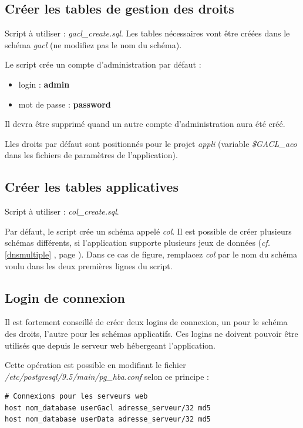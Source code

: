 \subsection{Créer les tables de gestion des droits}
Script à utiliser : \textit{gacl\_create.sql}. Les tables nécessaires vont être créées dans le schéma \textit{gacl} (ne modifiez pas le nom du schéma).

Le script crée un compte d'administration par défaut :
\begin{itemize}
\item login : \textbf{admin}
\item mot de passe : \textbf{password}
\end{itemize}

Il devra être supprimé quand un autre compte d'administration aura été créé.

Lles droits par défaut sont positionnés pour le projet \textit{appli} (variable \textit{\$GACL\_aco} dans les fichiers de paramètres de l'application).


\subsection{Créer les tables applicatives}
Script à utiliser : \textit{col\_create.sql}.

Par défaut, le script crée un schéma appelé \textit{col}. Il est possible de créer plusieurs schémas différents, si l'application supporte plusieurs jeux de données (\textit{cf.} \ref{dnsmultiple} \textit{}, page \pageref{dnsmultiple}). Dans ce cas de figure, remplacez \textit{col} par le nom du schéma voulu dans les deux premières lignes du script.

\subsection{Login de connexion}

Il est fortement conseillé de créer deux logins de connexion, un pour le schéma des droits, l'autre pour les schémas applicatifs. Ces logins ne doivent pouvoir être utilisés que depuis le serveur web hébergeant l'application.

Cette opération est possible en modifiant le fichier \textit{/etc/postgresql/9.5/main/pg\_hba.conf} selon ce principe :

\begin{lstlisting}
# Connexions pour les serveurs web 
host nom_database userGacl adresse_serveur/32 md5 
host nom_database userData adresse_serveur/32 md5
\end{lstlisting}


